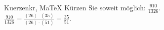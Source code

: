 \begin{MAufgabe}{Kuerzen}{kr, MaTeX}
K\"urzen Sie soweit m\"oglich: $\frac{910}{1326}$.\\ 
\ifLsg\MLoesung
\quad $\frac{910}{1326}=\frac{(26)\cdot(35)}{(26)\cdot(51)}=\frac{35}{51}$.\else\relax\fi
 \end{MAufgabe}